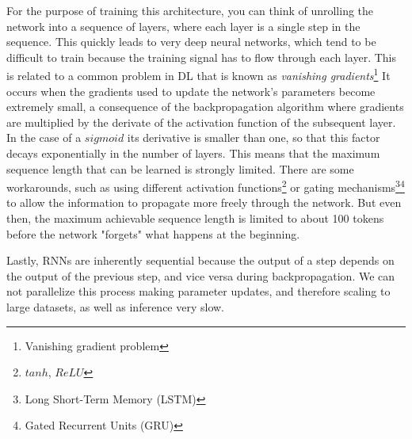 For the purpose of training this architecture, you can think of unrolling the network into a sequence of layers, where each layer is a single step in the sequence.
This quickly leads to very deep neural networks, which tend to be difficult to train because the training signal has to flow through each layer.
This is related to a common problem in DL that is known as \textit{vanishing gradients}\footnote{Vanishing gradient problem}
It occurs when the gradients used to update the network's parameters become extremely small, a consequence of the backpropagation algorithm where gradients are multiplied by the derivate of the activation function of the subsequent layer.
In the case of a $sigmoid$ its derivative is smaller than one, so that this factor decays exponentially in the number of layers.
This means that the maximum sequence length that can be learned is strongly limited.
There are some workarounds, such as using different activation functions\footnote{$tanh$, $ReLU$} or gating mechanisms\footnote{Long Short-Term Memory (LSTM)}\footnote{Gated Recurrent Units (GRU)} to allow the information to propagate more freely through the network.
But even then, the maximum achievable sequence length is limited to about 100 tokens before the network "forgets" what happens at the beginning.

Lastly, RNNs are inherently sequential because the output of a step depends on the output of the previous step, and vice versa during backpropagation.
We can not parallelize this process making parameter updates, and therefore scaling to large datasets, as well as inference very slow.

